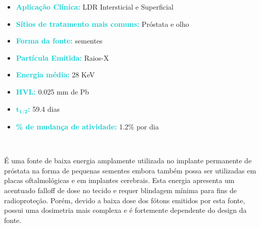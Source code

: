 \documentclass[11pt,a4paper]{article}
\begin{document}
		\begin{tcolorbox}[width=\textwidth, colback={white}, colbacktitle={DarkTurquoise!50!white}, title={$\bigstar$ \LobsterTwo{Iodo 125} $\bigstar$}, coltitle={CarnationPink}, colframe={DarkTurquoise}, fonttitle=\rmfamily\bfseries\Large, breakable]	
			\begin{itemize}
				\item \textcolor{DarkTurquoise}{\textbf{Aplicação Clínica:}} LDR Intersticial e Superficial
				\item \textcolor{DarkTurquoise}{\textbf{Sítios de tratamento mais comuns:}} Próstata e olho
				\item \textcolor{DarkTurquoise}{\textbf{Forma da fonte:}} sementes
				\item \textcolor{DarkTurquoise}{\textbf{Partícula Emitida:}} Raios-X
				\item \textcolor{DarkTurquoise}{\textbf{Energia média:}} 28 KeV
				\item \textcolor{DarkTurquoise}{\textbf{HVL:}} 0.025 mm de Pb
				\item \textcolor{DarkTurquoise}{\textbf{$\mathbf{t_{1/2}}$:}} 59.4 dias
				\item \textcolor{DarkTurquoise}{\textbf{\% de mudança de atividade:}} 1.2\% por dia
			\end{itemize}
		\end{tcolorbox}
			\

			É uma fonte de baixa energia amplamente utilizada no implante permanente de próstata na forma de pequenas sementes embora também possa ser utilizadas em placas oftalmológicas e em implantes cerebrais. Esta energia apresenta um acentuado falloff de dose no tecido e requer blindagem mínima para fins de radioproteção. Porém, devido a baixa dose dos fótons emitidos por esta fonte, possui uma dosimetria mais complexa e é fortemente dependente do design da fonte.

			\
\end{document}

